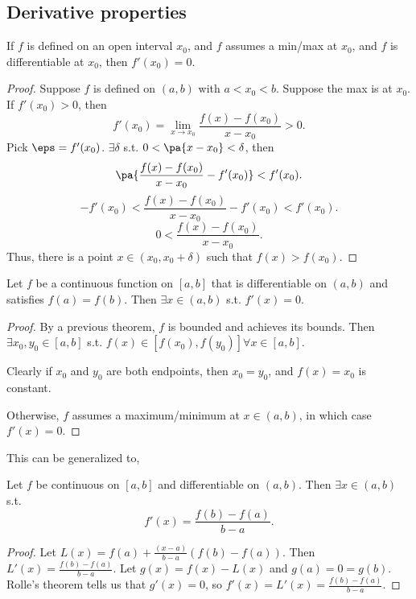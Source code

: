 \documentclass[11pt]{scrartcl}
\numberwithin{equation}{section}
\begin{document}
\subsection{Derivative properties}
\begin{theorem}
    If $f$ is defined on an open interval $x_0$, and $f$ assumes 
    a min/max at $x_0$, and $f$ is differentiable at $x_0$,
    then $f'(x_0) = 0$.
\end{theorem}
\begin{proof}
    Suppose $f$ is defined on $(a,b)$ with $a<x_0<b$. Suppose 
    the max is at $x_0$.
    If $f'(x_0)>0$, then 
    \[
        f'(x_0) = \lim_{x\rightarrow x_0}\frac{f(x)-f(x_0)}{x-x_0}>0.
    \]
    Pick $\eps = f'(x_0)$. $\exists \delta$ s.t. $0<\pa{x-x_0}<\delta$,
    then 
    \[
        \pa{\frac{f(x)-f(x_0)}{x-x_0}-f'(x_0)} < f'(x_0).
    \]
    \[
        -f'(x_0)< \frac{f(x)-f(x_0)}{x-x_0}-f'(x_0)< f'(x_0).
    \]
    \[
        0< \frac{f(x)-f(x_0)}{x-x_0}.
    \]
    Thus, there is a point $x \in (x_0,x_0+\delta)$
    such that $f(x)>f(x_0)$.
\end{proof}
\begin{theorem}
    \label{thm:rollesthm}
    Let $f$ be a continuous function on $[a,b]$ that is differentiable on 
    $(a,b)$ and satisfies $f(a)=f(b)$.  Then $\exists x\in(a,b)$ 
    s.t. $f'(x) = 0$.
\end{theorem}
\begin{proof}
    By a previous theorem, $f$ is bounded and achieves its bounds.
    Then $\exists x_0,y_0\in[a,b]$ s.t. $f(x)\in [f(x_0),f(y_0)]
    \forall x\in[a,b]$.

    Clearly if $x_0$ and $y_0$ are both endpoints, then $x_0=y_0$,
    and $f(x) = x_0$ is constant.

    Otherwise, $f$ assumes a maximum/minimum at $x\in(a,b)$,
    in which case $f'(x)=0$.
\end{proof}
This can be generalized to,
\begin{theorem}
    \label{thm:mvt}
    Let $f$ be continuous on $[a,b]$ and differentiable on $(a,b)$.
    Then $\exists x\in(a,b)$ s.t. 
    \[
        f'(x) = \frac{f(b)-f(a)}{b-a}.
    \]
\end{theorem}
\begin{proof}
    Let $L(x) = f(a) + \frac{(x-a)}{b-a}(f(b)-f(a))$.
    Then $L'(x) = \frac{f(b)-f(a)}{b-a}$. Let $g(x) = f(x) - L(x)$ and 
    $g(a)=0=g(b)$. Rolle's theorem tells us that $g'(x)=0$, so 
    $f'(x) = L'(x) = \frac{f(b)-f(a)}{b-a}$.
\end{proof}
\end{document}
